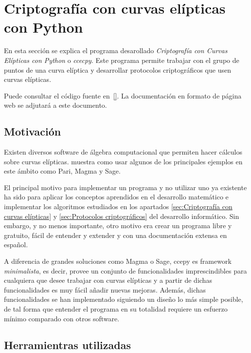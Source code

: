 \section{Criptografía con curvas elípticas con Python}
\label{sec:Criptografía con curvas elípticas con Python}

En esta sección se explica el programa desarollado \emph{Criptografía con Curvas Elípticas con Python} o \emph{ccecpy}. Este programa permite trabajar con el grupo de puntos de una curva elíptica y desarrollar protocolos criptográficos que usen curvas elípticas.

Puede consultar el código fuente en~\ref{}. La documentación en formato de página web se adjutará a este documento.

\subsection{Motivación}
\label{sub:Motivación}

Existen diversos software de álgebra computacional que permiten hacer cálculos sobre curvas elípticas. \cite{Washington:2008} muestra como usar algunos de los principales ejemplos en este ámbito como Pari, Magma y Sage.

El principal motivo para implementar un programa y no utilizar uno ya existente ha sido para aplicar los conceptos aprendidos en el desarrollo matemático e implementar los algoritmos estudiados en los apartados \ref{sec:Criptografía con curvas elípticas} y \ref{sec:Protocolos criptográficos} del desarrollo informático. Sin embargo, y no menos importante, otro motivo era crear un programa libre y gratuito,
fácil de entender y extender y con una documentación extensa en español.

A diferencia de grandes soluciones como Magma o Sage, ccepy es framework \emph{minimalista}, es decir, provee un conjunto de funcionalidades imprescindibles para cualquiera que desee trabajar con curvas elípticas y a partir de dichas funcionalidades es muy fácil añadir nuevas mejoras. Además, dichas funcionalidades se han implementado siguiendo un diseño lo más simple posible, de tal forma que entender el programa en su totalidad requiere un esfuerzo mínimo comparado con otros software.

\subsection{Herramientras utilizadas}
\label{sub:Herramientras utilizadas}

